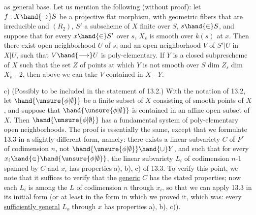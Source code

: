 
as general base. Let us mention the following (without proof): let $f:X\hand{\to} S$
be a projective flat morphism,  with geometric fibers that are
 irreducible and $(R_2)$, $S'$ a subscheme of $X$ finite over $S$,
$s\hand{\in} S$, and suppose that for every $x\hand{\in} S'$ over $s$, $X_s$ is smooth over
$k(s)$ at $x$. Then there exist  open neighborhood $U$ of $s$, and an open
neighborhood $V$ of $S'|U$ in $X|U$, such that $V\hand{\longrightarrow} U$ is poly-elementary.
If $Y$ is a closed subprescheme of $X$ such that the set $Z$ of points
at which $Y$ is not smooth over $S$   
dim $Z_s$ \hand{$\leq$} dim $X_s$ - 2, then above we can take $V$ contained in
$X$ - $Y$.

c) (Possibly to be included in the statement of 13.2.) With
the notation of 13.2, let $\hand{\unsure{\phi|\emptyset}}$ be a finite subset of $X$ consisting of smooth
points of $X$, and suppose that $\hand{\unsure{\phi|\emptyset}}$ is contained in an  affine open subset
of $X$. Then $\hand{\unsure{\phi|\emptyset}}$ has a fundamental system of poly-elementary open
neighborhoods.  The proof is essentially the same, except
that we formulate 13.3 in a slightly different form, namely: there
exists a linear subvariety $C$ of $P^r$ of codimension $n$, not 
$\hand{\unsure{\phi|\emptyset}}\hand{\cup} Y$, and such that for every $x_i\hand{\in}\hand{\unsure{\phi|\emptyset}}$, the linear
subvariety $L_i$ of codimension $n$-1 spanned by $C$ and $x_i$ has properties
a), b), c) of 13.3. To verify this point, we note that it suffices to
verify that the \uline{generic} $C$ has the stated properties; now  
 each $L_i$ is  among the $L$ of codimension $n$ through
$x_i$, so that we can apply 13.3 in its initial form
(or at least in the form in which we proved it, which was: every
\uline{sufficiently general} $L_o$ through $x$ has properties a), b), c)).

